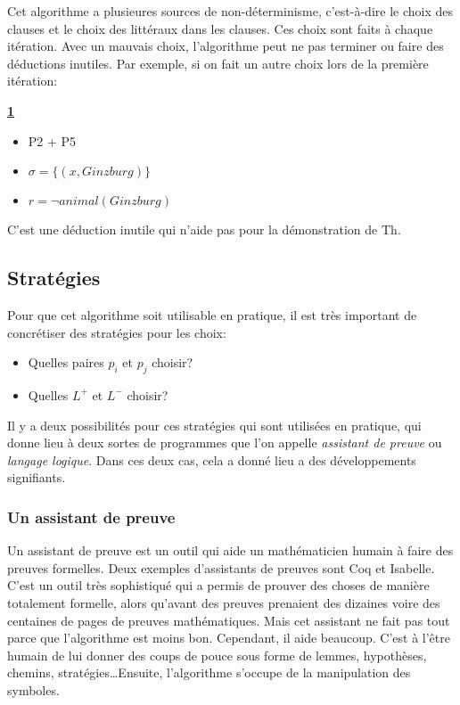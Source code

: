 {Cet algorithme a plusieures sources de non-déterminisme, c'est-à-dire
le choix des clauses et le choix des littéraux dans les clauses.
Ces choix sont faits à chaque itération.
Avec un mauvais choix, l'algorithme peut ne pas terminer ou
faire des déductions inutiles.
Par exemple, si on fait un autre choix lors de la première itération:

\textbf{\underline{1}}
\begin{itemize}
  \item P2 + P5
  \item $\sigma = \big\{ (x, Ginzburg) \big\}$
  \item $r = \neg animal(Ginzburg)$
\end{itemize}

C'est une déduction inutile qui n'aide pas pour la démonstration de $\mathrm{Th}$.

\subsection{Stratégies}

Pour que cet algorithme soit utilisable en pratique, il est très important
de concrétiser des stratégies pour les choix:
\begin{itemize}
  \item Quelles paires $p_i$ et $p_j$ choisir?
  \item Quelles $L^{+}$ et $L^{-}$ choisir?
\end{itemize}
Il y a deux possibilités pour ces stratégies qui sont utilisées en pratique,
qui donne lieu à deux sortes de programmes que l'on appelle {\em assistant de preuve}
ou {\em langage logique}.
Dans ces deux cas, cela a donné lieu a des développements signifiants.

\subsubsection{Un assistant de preuve}

Un assistant de preuve est un outil qui aide un mathématicien humain à faire des preuves formelles.
Deux exemples d'assistants de preuves sont Coq et Isabelle. C'est un
outil très sophistiqué qui a permis de prouver des choses de manière
totalement formelle, alors qu'avant des preuves prenaient des dizaines
voire des centaines de pages de preuves mathématiques. Mais cet
assistant ne fait pas tout parce que l'algorithme est moins bon.
Cependant, il aide beaucoup. C'est à l'être humain de lui donner des
coups de pouce sous forme de lemmes, hypothèses, chemins,
stratégies\ldots Ensuite, l'algorithme s'occupe de la manipulation des symboles.

}
